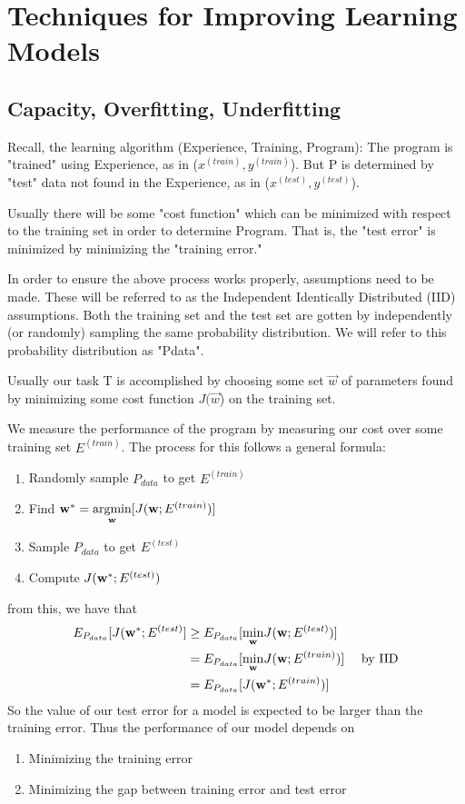 

\chapter{Techniques for Improving Learning Models} 

\section{Capacity, Overfitting, Underfitting}
Recall, the learning algorithm (Experience, Training, Program):
The program is "trained" using Experience, as in ($x^{{(train)}},y^{{(train)}}$).
But P is determined by "test" data not found in the Experience, as in ($x^{{(test)}},y^{{(test)}}$).

Usually there will be some "cost function" which can be minimized with respect to the training set in order to determine Program. That is, the "test error" is minimized by minimizing the "training error."

In order to ensure the above process works properly, assumptions need to be made. These will be referred to as the Independent Identically Distributed (IID) assumptions. Both the training set and the test set are gotten by independently (or randomly) sampling the same probability distribution. We will refer to this probability distribution as "Pdata".

Usually our task T is accomplished by choosing some set $\overrightarrow{w}$ of parameters found by minimizing some cost function $J(\overrightarrow{w}$) on the training set.

We measure the performance of the program by measuring our cost over some training set $E^{{(train)}}$.
The process for this follows a general formula:
\begin{enumerate}
    \item Randomly sample $P_{data}$ to get $E^{{(train)}}$
    \item Find $\vw^{\ast}=\underset{\vw}{\argmin}[J(\vw;E^{{(train)}})]$
    \item Sample $P_{data}$ to get $E^{{(test)}}$
    \item Compute $J(\vw^{\ast};E^{{(test)}})$
\end{enumerate}
from this, we have that 
\begin{align*}
E_{P_{data}}[J(\vw^{\ast};E^{{(test)}}] &\geq E_{P_{data}}[\underset{\vw}{\min}J(\vw;E^{{(test)}})] \\
&=E_{P_{data}}[\underset{\vw}{\min}J(\vw;E^{{(train)}})] & \text{ by IID}\\
&=E_{P_{data}}[J(\vw^{\ast};E^{{(train)}})]
\end{align*}
So the value of our test error for a model is expected to be larger than the training error. Thus the performance of our model depends on
\begin{enumerate}
    \item Minimizing the training error
    \item Minimizing the gap between training error and test error
\end{enumerate}

